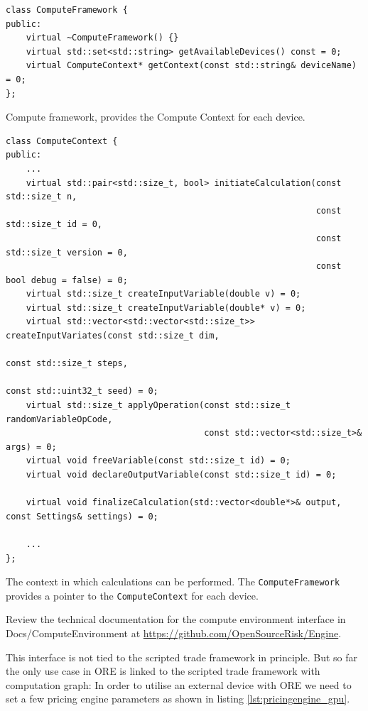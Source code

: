 \documentclass[12pt, a4paper]{report}
\begin{document}
\begin{listing}[hbt]
\begin{verbatim}
class ComputeFramework {
public:
    virtual ~ComputeFramework() {}
    virtual std::set<std::string> getAvailableDevices() const = 0;
    virtual ComputeContext* getContext(const std::string& deviceName) = 0;
};
\end{verbatim}
\caption{Compute framework, provides the Compute Context for each device.}
\label{lst:computeframework}
\end{listing}

\begin{listing}[hbt]
\begin{verbatim}
class ComputeContext {
public:
    ...
    virtual std::pair<std::size_t, bool> initiateCalculation(const std::size_t n,
                                                             const std::size_t id = 0,
                                                             const std::size_t version = 0,
                                                             const bool debug = false) = 0;
    virtual std::size_t createInputVariable(double v) = 0;
    virtual std::size_t createInputVariable(double* v) = 0;
    virtual std::vector<std::vector<std::size_t>> createInputVariates(const std::size_t dim,
                                                                      const std::size_t steps,
                                                                      const std::uint32_t seed) = 0;
    virtual std::size_t applyOperation(const std::size_t randomVariableOpCode,
                                       const std::vector<std::size_t>& args) = 0;
    virtual void freeVariable(const std::size_t id) = 0;
    virtual void declareOutputVariable(const std::size_t id) = 0;

    virtual void finalizeCalculation(std::vector<double*>& output, const Settings& settings) = 0;

    ...    
};
\end{verbatim}
\caption{The context in which calculations can be performed. The {\tt ComputeFramework} provides a pointer
  to the {\tt ComputeContext} for each device.}
\label{lst:computecontext}
\end{listing}

Review the technical documentation for the compute environment interface in Docs/ComputeEnvironment
at \url{https://github.com/OpenSourceRisk/Engine}.

This interface is not tied to the scripted trade framework in principle. But so far the only use
case in ORE is linked to the scripted trade framework with computation graph: In order to utilise an
external device with ORE we need to set a few pricing engine parameters as shown in listing
\ref{lst:pricingengine_gpu}.
\end{document}
